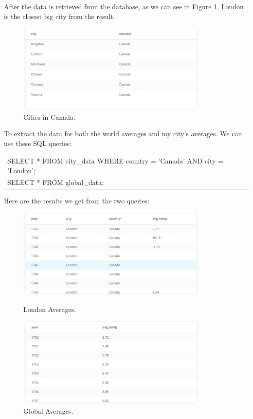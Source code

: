 \documentclass{article}
\begin{document}
After the data is retrieved from the database, as we can see in Figure 1, London is the closest big city from the result. 
\begin{figure}[H]
  \begin{center}
    \includegraphics[width=0.85\textwidth]{canada_cities}
    \caption{Cities in Canada.}
  \end{center}
\end{figure}
To extract the data for both the world averages and my city’s averages. We can use these SQL queries:
\begin{center}  
  \begin{tabular}{l}
      SELECT * FROM city\_data WHERE country = 'Canada' AND city = 'London'; \\
      SELECT * FROM global\_data; \\
  \end{tabular}
\end{center}
Here are the results we get from the two queries: 
\begin{figure}[ht]
  \begin{center}
    \includegraphics[width=0.85\textwidth]{london_average}
    \caption{London Averages.}
  \end{center}
  \begin{center}
    \includegraphics[width=0.85\textwidth]{global_averages}
    \caption{Global Averages.}
  \end{center}
\end{figure}
\end{document}
